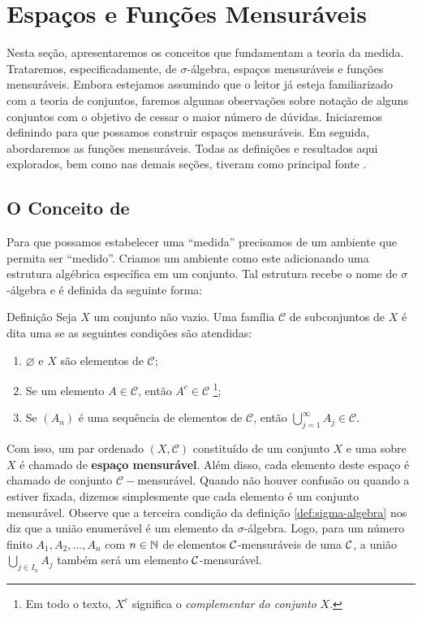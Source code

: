 \chapter{Espaços e Funções Mensuráveis}

Nesta seção, apresentaremos os conceitos que fundamentam a teoria da medida. Trataremos, especificadamente, de $\sigma$-álgebra, espaços mensuráveis e funções mensuráveis. 
Embora estejamos assumindo que o leitor já esteja familiarizado com a teoria de conjuntos, faremos algumas observações sobre notação de alguns conjuntos com o objetivo de cessar o maior número de dúvidas.
Iniciaremos definindo \sigal para que possamos construir espaços mensuráveis.
Em seguida, abordaremos as funções mensuráveis.
Todas as definições e resultados aqui explorados, bem como nas demais seções,  tiveram como principal fonte \cite{bartle}.

\section{O Conceito de \sigal}
Para que possamos estabelecer uma \enquote{medida} precisamos de um ambiente que permita ser \enquote{medido}. 
Criamos um ambiente como este adicionando uma estrutura algébrica específica em um conjunto.
Tal estrutura recebe o nome de $\sigma$-álgebra e é definida da seguinte forma:

\begin{env}{Definição}
\label{def:sigma-algebra}
    Seja $X$ um conjunto não vazio. Uma família $\mathcal{C}$ de subconjuntos de $X$ é dita uma \sigal se as seguintes condições são atendidas:
    \begin{enumerate}[label*= (\roman*)]
        \item $\varnothing$ e $X$ são elementos de $\mathcal{C}$;     
        \item Se um elemento $A \in \mathcal{C}$, então $A^c \in \mathcal{C}$
        \footnote{Em todo o texto, $X^c$ significa o \textit{complementar do conjunto} $X$.};
        \item Se $(A_n)$ é uma sequência de elementos de $\mathcal{C}$, 
        então $\displaystyle \bigcup_{j = 1}^\infty A_j \in \mathcal{C}$.
        \vspace{-0.2cm}
    \end{enumerate}
\end{env}

Com isso, um par ordenado $(X, \mathcal{C})$  constituído de um conjunto $X$ e uma \sigal sobre $X$ é chamado de  \textbf{espaço mensurável}.
Além disso, cada elemento deste espaço é chamado de conjunto $\mathcal{C}-$mensurável.
Quando não houver confusão ou quando a \sigal estiver fixada, dizemos simplesmente que cada elemento é um conjunto mensurável. 
Observe que a terceira condição da definição \ref{def:sigma-algebra} nos diz que a união enumerável é um elemento da $\sigma$-álgebra.
Logo, para um número finito $A_1, A_2, ..., A_n$ com $n \in \operatorname{\mathbb{N}}$ de elementos $\operatorname{\mathcal{C}}$-mensuráveis de uma \sigal $\operatorname{\mathcal{C}}$, a união $\displaystyle \bigcup_{j \in I_n} A_j$ também será um elemento $\operatorname{\mathcal{C}}$-mensurável.

